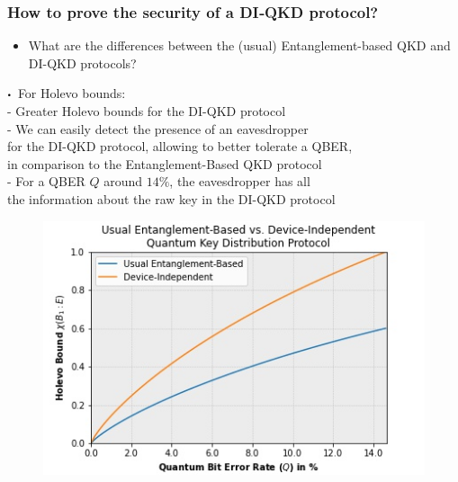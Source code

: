 \documentclass{beamer}
\newcommand\sbullet[1][.5]{\mathbin{\vcenter{\hbox{\scalebox{#1}{$\bullet$}}}}}
\begin{document}
		\begin{frame}
			\frametitle{\large How to prove the security of a DI‑QKD protocol?}

            \vspace{4ex}
            \begin{itemize}
                \item What are the differences between the (usual) Entanglement-based QKD and DI-QKD protocols?
            \end{itemize}
            
            \begin{minipage}{0.5\textwidth}
                \centering
                \vspace{0.5ex}
                \scriptsize
                $\sbullet$\, For Holevo bounds:\\
                \vspace{0.25ex}
                \tiny
                - Greater Holevo bounds for the DI-QKD protocol\\
                - We can easily detect the presence of an eavesdropper\\for the DI-QKD protocol, allowing to better tolerate a QBER,\\ in comparison to the Entanglement-Based QKD protocol\\
                - For a QBER $Q$ around $14\%$, the eavesdropper has all\\ the information about the raw key in the DI-QKD protocol
                \vspace{-1.2ex}
                \begin{figure}
                    \includegraphics[width=\linewidth]{figures/jpg/holevo-bounds-plot.jpg}

\end{figure}
\end{minipage}
\end{frame}
\end{document}

